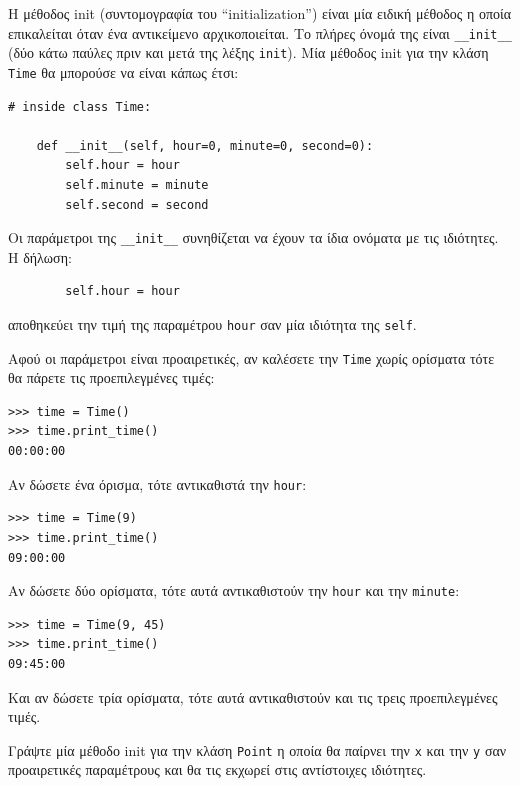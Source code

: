 \documentclass[10pt]{book}
\begin{document}
Η μέθοδος init (συντομογραφία του ``initialization'') είναι μία ειδική μέθοδος η οποία επικαλείται όταν ένα
αντικείμενο αρχικοποιείται. Το πλήρες όνομά της είναι \verb"__init__" (δύο κάτω παύλες πριν και μετά της λέξης
{\tt init}). Μία μέθοδος init για την κλάση {\tt Time} θα μπορούσε να είναι κάπως έτσι:

\begin{verbatim}
# inside class Time:

    def __init__(self, hour=0, minute=0, second=0):
        self.hour = hour
        self.minute = minute
        self.second = second
\end{verbatim}
%
Οι παράμετροι της \verb"__init__" συνηθίζεται να έχουν τα ίδια ονόματα με τις ιδιότητες.
Η δήλωση:

\begin{verbatim}
        self.hour = hour
\end{verbatim}
%
αποθηκεύει την τιμή της παραμέτρου  {\tt hour}  σαν μία ιδιότητα της  
{\tt self}.

Αφού οι παράμετροι είναι προαιρετικές, αν καλέσετε την {\tt Time} χωρίς ορίσματα τότε θα πάρετε τις
προεπιλεγμένες τιμές:

\begin{verbatim}
>>> time = Time()
>>> time.print_time()
00:00:00
\end{verbatim}
%
Αν δώσετε ένα όρισμα, τότε αντικαθιστά την {\tt hour}:

\begin{verbatim}
>>> time = Time(9)
>>> time.print_time()
09:00:00
\end{verbatim}
%
Αν δώσετε δύο ορίσματα, τότε αυτά αντικαθιστούν την {\tt hour} και την {\tt minute}:

\begin{verbatim}
>>> time = Time(9, 45)
>>> time.print_time()
09:45:00
\end{verbatim}
%
Και αν δώσετε τρία ορίσματα, τότε αυτά αντικαθιστούν και τις τρεις προεπιλεγμένες τιμές.
\\

\begin{exercise}

Γράψτε μία μέθοδο init για την κλάση {\tt Point} η οποία θα παίρνει την {\tt x} και την {\tt y} σαν προαιρετικές
παραμέτρους και θα τις εκχωρεί στις αντίστοιχες ιδιότητες.
\end{exercise}
\end{document}
